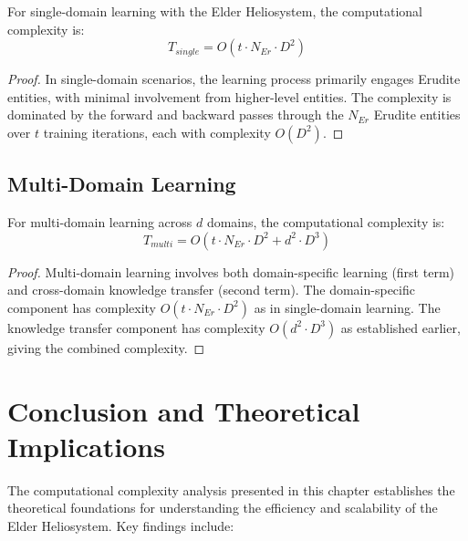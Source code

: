 \begin{theorem}
For single-domain learning with the Elder Heliosystem, the computational complexity is:
\begin{equation}
T_{single} = O(t \cdot N_{Er} \cdot D^2)
\end{equation}
\end{theorem}

\begin{proof}
In single-domain scenarios, the learning process primarily engages Erudite entities, with minimal involvement from higher-level entities. The complexity is dominated by the forward and backward passes through the $N_{Er}$ Erudite entities over $t$ training iterations, each with complexity $O(D^2)$.
\end{proof}

\subsection{Multi-Domain Learning}

\begin{theorem}
For multi-domain learning across $d$ domains, the computational complexity is:
\begin{equation}
T_{multi} = O(t \cdot N_{Er} \cdot D^2 + d^2 \cdot D^3)
\end{equation}
\end{theorem}

\begin{proof}
Multi-domain learning involves both domain-specific learning (first term) and cross-domain knowledge transfer (second term). The domain-specific component has complexity $O(t \cdot N_{Er} \cdot D^2)$ as in single-domain learning. The knowledge transfer component has complexity $O(d^2 \cdot D^3)$ as established earlier, giving the combined complexity.
\end{proof}



\section{Conclusion and Theoretical Implications}

The computational complexity analysis presented in this chapter establishes the theoretical foundations for understanding the efficiency and scalability of the Elder Heliosystem. Key findings include:

